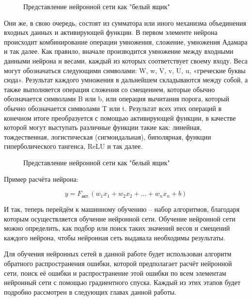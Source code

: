 {  \begin{figure}
    \centering
    \def\svgwidth{\textwidth}
    
    \caption{Представление нейронной сети как "белый ящик"}
    \label{fig:NNWhiteBox}
  \end{figure}

  \par Они же, в свою очередь, состоят из сумматора или иного механизма объединения входных данных и активирующей функции. В первом элементе нейрона происходит комбинирование операции умножения, сложение, умножения Адамара и так далее. Как правило, вначале производится умножение между входными данными нейрона и весами, каждый из которых соответствует своему входу. Веса могут обозначаться следующими символами: W, w, V, v, U, u, «греческие буквы сюда». Результат каждого умножения в дальнейшем складываются между собой, а также выполняется операция сложения со смещением, которые обычно обозначается символами B или b, или операция вычитания порога, который обычно обозначается символами T или t.  Результат всех этих операций в конечном итоге преобразуется с помощью активирующей функции, в качестве которой могут выступать различные функции такие как: линейная, тождественная, логистическая (сигмоидальная), биполярная, функции гиперболического тангенса, ReLU и так далее.  

  \begin{figure}
    \centering
    \def\svgwidth{\textwidth}
    
    \caption{Представление нейронной сети как "белый ящик"}
    \label{fig:Neuron}
  \end{figure}

  Пример расчёта нейрона:

  \[y = F_{акт.}\left(w_1x_1 + w_2x_2 + \dots + w_nx_n + b\right)\]

  \par И так, теперь перейдём к машинному обучению – набор алгоритмов, благодаря которым осуществляется обучение нейронной сети. Обучение нейронной сети можно определить, как подбор или поиск таких значений весов и смещений каждого нейрона, чтобы нейронная сеть выдавала необходимы результаты. 
  
  \par Для обучения нейронных сетей в данной работе будет использован алгоритм обратного распространения ошибки, которой предполагает расчёт нейронной сети, поиск её ошибки и распространение этой ошибки по всем элементам нейронный сети с помощью градиентного спуска. Каждый из этих этапов будет подробно рассмотрен в следующих главах данной работы.

}
